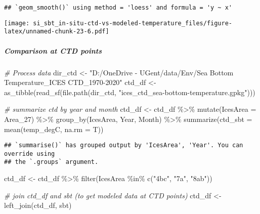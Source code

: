 \documentclass[
]{article}
\newenvironment{Shaded}{\begin{snugshade}}{\end{snugshade}}
\newcommand{\AttributeTok}[1]{\textcolor[rgb]{0.77,0.63,0.00}{#1}}
\newcommand{\CommentTok}[1]{\textcolor[rgb]{0.56,0.35,0.01}{\textit{#1}}}
\newcommand{\FunctionTok}[1]{\textcolor[rgb]{0.00,0.00,0.00}{#1}}
\newcommand{\NormalTok}[1]{#1}
\newcommand{\OtherTok}[1]{\textcolor[rgb]{0.56,0.35,0.01}{#1}}
\newcommand{\SpecialCharTok}[1]{\textcolor[rgb]{0.00,0.00,0.00}{#1}}
\newcommand{\StringTok}[1]{\textcolor[rgb]{0.31,0.60,0.02}{#1}}
\begin{document}
\begin{verbatim}
## `geom_smooth()` using method = 'loess' and formula = 'y ~ x'
\end{verbatim}

\texttt{[image: si\_sbt\_in-situ-ctd-vs-modeled-temperature\_files/figure-latex/unnamed-chunk-23-6.pdf]}

\hypertarget{comparison-at-ctd-points}{%
\subparagraph{Comparison at CTD points}\label{comparison-at-ctd-points}}

\begin{Shaded}
\begin{Highlighting}[]
\CommentTok{\# Process data}
\NormalTok{dir\_ctd }\OtherTok{\textless{}{-}} \StringTok{"D:/OneDrive {-} UGent/data/Env/Sea Bottom Temperature\_ICES CTD\_1970{-}2020"}
\NormalTok{ctd\_df }\OtherTok{\textless{}{-}} \FunctionTok{as\_tibble}\NormalTok{(}\FunctionTok{read\_sf}\NormalTok{(}\FunctionTok{file.path}\NormalTok{(dir\_ctd, }\StringTok{"ices\_ctd\_sea{-}bottom{-}temperature.gpkg"}\NormalTok{)))}

\CommentTok{\# summarize ctd by year and month}
\NormalTok{ctd\_df }\OtherTok{\textless{}{-}}\NormalTok{ ctd\_df }\SpecialCharTok{\%\textgreater{}\%} \FunctionTok{mutate}\NormalTok{(}\AttributeTok{IcesArea =}\NormalTok{ Area\_27) }\SpecialCharTok{\%\textgreater{}\%} \FunctionTok{group\_by}\NormalTok{(IcesArea, Year, Month) }\SpecialCharTok{\%\textgreater{}\%} \FunctionTok{summarize}\NormalTok{(}\AttributeTok{ctd\_sbt =} \FunctionTok{mean}\NormalTok{(temp\_degC, }\AttributeTok{na.rm =}\NormalTok{ T))}
\end{Highlighting}
\end{Shaded}

\begin{verbatim}
## `summarise()` has grouped output by 'IcesArea', 'Year'. You can override using
## the `.groups` argument.
\end{verbatim}

\begin{Shaded}
\begin{Highlighting}[]
\NormalTok{ctd\_df }\OtherTok{\textless{}{-}}\NormalTok{ ctd\_df }\SpecialCharTok{\%\textgreater{}\%} \FunctionTok{filter}\NormalTok{(IcesArea }\SpecialCharTok{\%in\%} \FunctionTok{c}\NormalTok{(}\StringTok{"4bc"}\NormalTok{, }\StringTok{"7a"}\NormalTok{, }\StringTok{"8ab"}\NormalTok{))}

\CommentTok{\# join ctd\_df and sbt (to get modeled data at CTD points)}
\NormalTok{ctd\_df }\OtherTok{\textless{}{-}} \FunctionTok{left\_join}\NormalTok{(ctd\_df, sbt)}
\end{Highlighting}
\end{Shaded}
\end{document}

